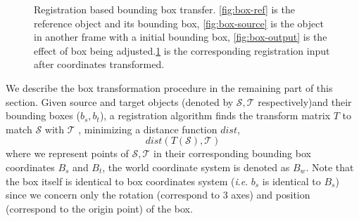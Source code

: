 \documentclass[letterpaper, 10 pt, conference]{ieeeconf}  %
\begin{document}
\begin{figure}[t]
\begin{subfigure}[t]{0.18\linewidth}
		\caption{}\label{fig:reg-input}
	\end{subfigure}\hfill

	
	\caption{Registration based bounding box transfer. \ref{fig:box-ref} is the reference object and its bounding box, \ref{fig:box-source} is the object in another frame with a initial  bounding box, \ref{fig:box-output} is the effect of box being adjusted.\ref{fig:reg-input} is the corresponding registration input after coordinates transformed.}
	\label {fig:annotation-transfer}
\end{figure}


We describe the box transformation procedure in the remaining part of this section. 
Given source and target objects (denoted by $\mathcal{S,T}$ respectively)and their bounding boxes ($b_s,b_t$), a registration algorithm finds the transform matrix $T$ to match $\mathcal{S}$ with $\mathcal{T}$ , minimizing a distance function $dist$,
$$dist(T(\mathcal{S}),\mathcal{T})$$
where we represent points of $\mathcal{S,T}$ in their corresponding bounding box coordinates $B_s$ and $B_t$, the world coordinate system is denoted as $B_w$. Note that the box itself is identical to box coordinates system (\textit{i}.\textit{e}. $b_s$ is identical to $B_s$) since we concern only the rotation (correspond to 3 axes) and position (correspond to the origin point) of the box.
\end{document}
